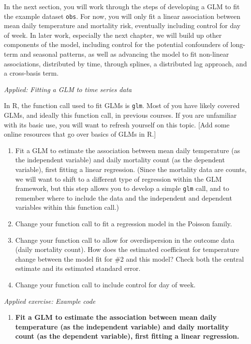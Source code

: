 \documentclass[
]{book}
\providecommand{\tightlist}{%
  \setlength{\itemsep}{0pt}\setlength{\parskip}{0pt}}
\begin{document}
In the next section, you will work through the steps of developing a GLM to fit
the example dataset \texttt{obs}. For now, you will only fit a linear association
between mean daily temperature and mortality risk, eventually including control
for day of week. In later work, especially the next chapter, we will build up
other components of the model, including control for the potential confounders
of long-term and seasonal patterns, as well as advancing the model to fit
non-linear associations, distributed by time, through splines, a distributed lag
approach, and a cross-basis term.

\emph{Applied: Fitting a GLM to time series data}

In R, the function call used to fit GLMs is \texttt{glm}. Most of you have likely
covered GLMs, and ideally this function call, in previous courses. If you are
unfamiliar with its basic use, you will want to refresh yourself on this
topic. {[}Add some online resources that go over basics of GLMs in R.{]}

\begin{enumerate}
\def\labelenumi{\arabic{enumi}.}
\tightlist
\item
  Fit a GLM to estimate the association between mean daily temperature (as the
  independent variable) and daily mortality count (as the dependent variable),
  first fitting a linear regression. (Since the mortality data are counts, we will
  want to shift to a different type of regression within the GLM framework, but
  this step allows you to develop a simple \texttt{glm} call, and to remember where to
  include the data and the independent and dependent variables within this
  function call.)
\item
  Change your function call to fit a regression model in the Poisson family.
\item
  Change your function call to allow for overdispersion in the outcome data
  (daily mortality count). How does the estimated coefficient for temperature
  change between the model fit for \#2 and this model? Check both the central
  estimate and its estimated standard error.
\item
  Change your function call to include control for day of week.
\end{enumerate}

\emph{Applied exercise: Example code}

\begin{enumerate}
\def\labelenumi{\arabic{enumi}.}
\tightlist
\item
  \textbf{Fit a GLM to estimate the association between mean daily temperature (as the
  independent variable) and daily mortality count (as the dependent variable),
  first fitting a linear regression.}
\end{enumerate}
\end{document}
